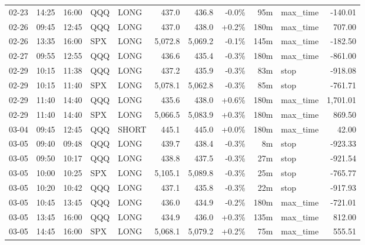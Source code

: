 \documentclass[11pt,a4paper,twoside]{article}
\begin{document}
\begin{center}
\begin{longtable}{>{\color{txtmain}}l l l l l r r r r >{\color{txtmain}}l r}
02-23 & 14:25 & 16:00 & QQQ & LONG & 437.0 & 436.8 & \textcolor{lossred}{-0.0\%} & 95m & max\_time & \textcolor{lossred}{-140.01} \\
02-26 & 09:45 & 12:45 & QQQ & LONG & 437.0 & 438.0 & \textcolor{wingreen}{+0.2\%} & 180m & max\_time & \textcolor{wingreen}{707.00} \\
02-26 & 13:35 & 16:00 & SPX & LONG & 5,072.8 & 5,069.2 & \textcolor{lossred}{-0.1\%} & 145m & max\_time & \textcolor{lossred}{-182.50} \\
02-27 & 09:55 & 12:55 & QQQ & LONG & 436.6 & 435.4 & \textcolor{lossred}{-0.3\%} & 180m & max\_time & \textcolor{lossred}{-861.00} \\
02-29 & 10:15 & 11:38 & QQQ & LONG & 437.2 & 435.9 & \textcolor{lossred}{-0.3\%} & 83m & stop & \textcolor{lossred}{-918.08} \\
02-29 & 10:15 & 11:40 & SPX & LONG & 5,078.1 & 5,062.8 & \textcolor{lossred}{-0.3\%} & 85m & stop & \textcolor{lossred}{-761.71} \\
02-29 & 11:40 & 14:40 & QQQ & LONG & 435.6 & 438.0 & \textcolor{wingreen}{+0.6\%} & 180m & max\_time & \textcolor{wingreen}{1,701.01} \\
02-29 & 11:40 & 14:40 & SPX & LONG & 5,066.5 & 5,083.9 & \textcolor{wingreen}{+0.3\%} & 180m & max\_time & \textcolor{wingreen}{869.50} \\
03-04 & 09:45 & 12:45 & QQQ & SHORT & 445.1 & 445.0 & \textcolor{wingreen}{+0.0\%} & 180m & max\_time & \textcolor{wingreen}{42.00} \\
03-05 & 09:40 & 09:48 & QQQ & LONG & 439.7 & 438.4 & \textcolor{lossred}{-0.3\%} & 8m & stop & \textcolor{lossred}{-923.33} \\
03-05 & 09:50 & 10:17 & QQQ & LONG & 438.8 & 437.5 & \textcolor{lossred}{-0.3\%} & 27m & stop & \textcolor{lossred}{-921.54} \\
03-05 & 10:00 & 10:25 & SPX & LONG & 5,105.1 & 5,089.8 & \textcolor{lossred}{-0.3\%} & 25m & stop & \textcolor{lossred}{-765.77} \\
03-05 & 10:20 & 10:42 & QQQ & LONG & 437.1 & 435.8 & \textcolor{lossred}{-0.3\%} & 22m & stop & \textcolor{lossred}{-917.93} \\
03-05 & 10:45 & 13:45 & QQQ & LONG & 436.0 & 434.9 & \textcolor{lossred}{-0.2\%} & 180m & max\_time & \textcolor{lossred}{-721.01} \\
03-05 & 13:45 & 16:00 & QQQ & LONG & 434.9 & 436.0 & \textcolor{wingreen}{+0.3\%} & 135m & max\_time & \textcolor{wingreen}{812.00} \\
03-05 & 14:45 & 16:00 & SPX & LONG & 5,068.1 & 5,079.2 & \textcolor{wingreen}{+0.2\%} & 75m & max\_time & \textcolor{wingreen}{555.51} \\

\end{longtable}
\end{center}
\end{document}
